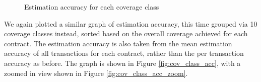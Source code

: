 \begin{figure}[h]
  \centering
  \caption{Estimation accuracy for each coverage class}%
  \label{fig:cov_class_accuracy}%
\end{figure}

We again plotted a similar graph of estimation accuracy, this time grouped via 10 coverage classes instead,
sorted based on the overall coverage achieved for each contract. The estimation accuracy is also
taken from the mean estimation accuracy of all transactions for each contract, rather than the
per transaction accuracy as before. The graph is shown in Figure \ref{fig:cov_class_acc},
with a zoomed in view shown in Figure \ref{fig:cov_class_acc_zoom}. 

